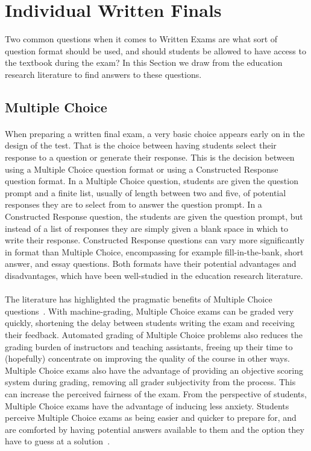 \documentclass[12pt]{article}
\begin{document}
\section{Individual Written Finals}\label{sec:written}
Two common questions when it comes to Written Exams are what sort of question format should be used, and should students be allowed to have access to the textbook during the exam? In this Section we draw from the education research literature to find answers to these questions.
\subsection{Multiple Choice}
\paragraph{}
When preparing a written final exam, a very basic choice appears early on in the design of the test. That is the choice between having students select their response to a question or generate their response. This is the decision between using a Multiple Choice question format or using a Constructed Response question format. In a Multiple Choice question, students are given the question prompt and a finite list, usually of length between two and five, of potential responses they are to select from to answer the question prompt. In a Constructed Response question, the students are given the question prompt, but instead of a list of responses they are simply given a blank space in which to write their response. Constructed Response questions can vary more significantly in format than Multiple Choice, encompassing for example fill-in-the-bank, short answer, and essay questions. Both formats have their potential advantages and disadvantages, which have been well-studied in the education research literature.
\paragraph{}
The literature has highlighted the pragmatic benefits of Multiple Choice questions~\cite{simkin2005multiple}. With machine-grading, Multiple Choice exams can be graded very quickly, shortening the delay between students writing the exam and receiving their feedback. Automated grading of Multiple Choice problems also reduces the grading burden of instructors and teaching assistants, freeing up their time to (hopefully) concentrate on improving the quality of the course in other ways. Multiple Choice exams also have the advantage of providing an objective scoring system during grading, removing all grader subjectivity from the process. This can increase the perceived fairness of the exam. From the perspective of students, Multiple Choice exams have the advantage of inducing less anxiety. Students perceive Multiple Choice exams as being easier and quicker to prepare for, and are comforted by having potential answers available to them and the option they have to guess at a solution~\cite{zeidner1987essay}.
\end{document}
